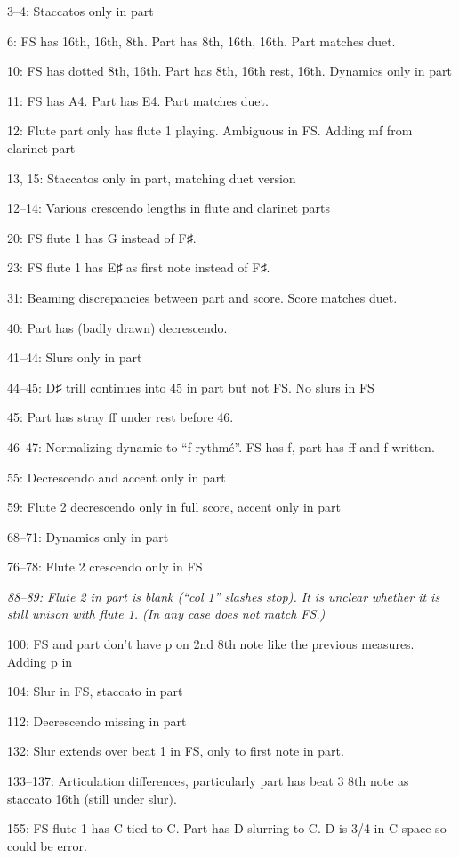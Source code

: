 \documentclass[twoside]{article}
\begin{document}
\begin{hangparas}{15pt}{1}
\begin{multicols}{2}
3--4: Staccatos only in part

6: FS has 16th, 16th, 8th. Part has 8th, 16th, 16th. Part matches duet.

10: FS has dotted 8th, 16th. Part has 8th, 16th rest, 16th. Dynamics only in part

11: FS has A4. Part has E4. Part matches duet.

12: Flute part only has flute 1 playing. Ambiguous in FS. Adding mf from clarinet part

13, 15: Staccatos only in part, matching duet version

12--14: Various crescendo lengths in flute and clarinet parts

20: FS flute 1 has G instead of F♯.

23: FS flute 1 has E♯ as first note instead of F♯.

31: Beaming discrepancies between part and score. Score matches duet.

40: Part has (badly drawn) decrescendo.

41--44: Slurs only in part

44--45: D♯ trill continues into 45 in part but not FS. No slurs in FS

45: Part has stray ff under rest before 46.

46--47: Normalizing dynamic to ``f rythmé''. FS has f, part has ff and f written.

55: Decrescendo and accent only in part

59: Flute 2 decrescendo only in full score, accent only in part

68--71: Dynamics only in part

76--78: Flute 2 crescendo only in FS

\textit{88--89: Flute 2 in part is blank (``col 1'' slashes stop). It is unclear whether it is still unison with flute 1. (In any case does not match FS.)}

100: FS and part don't have p on 2nd 8th note like the previous measures. Adding p in

104: Slur in FS, staccato in part

112: Decrescendo missing in part

132: Slur extends over beat 1 in FS, only to first note in part.

133--137: Articulation differences, particularly part has beat 3 8th note as staccato 16th (still under slur).

155: FS flute 1 has C tied to C. Part has D slurring to C. D is 3/4 in C space so could be error.


\end{multicols}
\end{hangparas}
\end{document}
